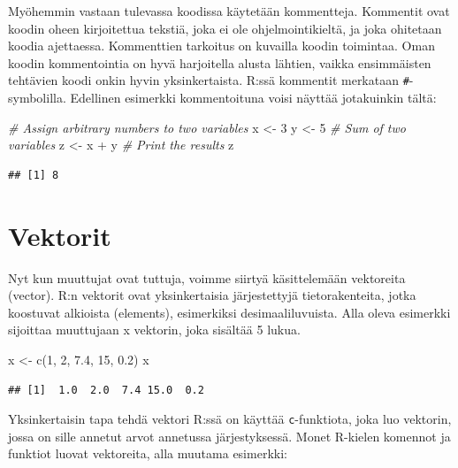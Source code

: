 \documentclass[
]{book}
\newenvironment{Shaded}{\begin{snugshade}}{\end{snugshade}}
\newcommand{\CommentTok}[1]{\textcolor[rgb]{0.56,0.35,0.01}{\textit{#1}}}
\newcommand{\DecValTok}[1]{\textcolor[rgb]{0.00,0.00,0.81}{#1}}
\newcommand{\FloatTok}[1]{\textcolor[rgb]{0.00,0.00,0.81}{#1}}
\newcommand{\FunctionTok}[1]{\textcolor[rgb]{0.00,0.00,0.00}{#1}}
\newcommand{\NormalTok}[1]{#1}
\newcommand{\OtherTok}[1]{\textcolor[rgb]{0.56,0.35,0.01}{#1}}
\newcommand{\SpecialCharTok}[1]{\textcolor[rgb]{0.00,0.00,0.00}{#1}}
\begin{document}
Myöhemmin vastaan tulevassa koodissa käytetään kommentteja. Kommentit ovat koodin oheen kirjoitettua tekstiä, joka ei ole ohjelmointikieltä, ja joka ohitetaan koodia ajettaessa. Kommenttien tarkoitus on kuvailla koodin toimintaa. Oman koodin kommentointia on hyvä harjoitella alusta lähtien, vaikka ensimmäisten tehtävien koodi onkin hyvin yksinkertaista. R:ssä kommentit merkataan \texttt{\#}-symbolilla. Edellinen esimerkki kommentoituna voisi näyttää jotakuinkin tältä:

\begin{Shaded}
\begin{Highlighting}[]
\CommentTok{\# Assign arbitrary numbers to two variables}
\NormalTok{x }\OtherTok{\textless{}{-}} \DecValTok{3}
\NormalTok{y }\OtherTok{\textless{}{-}} \DecValTok{5}
\CommentTok{\# Sum of two variables}
\NormalTok{z }\OtherTok{\textless{}{-}}\NormalTok{ x }\SpecialCharTok{+}\NormalTok{ y}
\CommentTok{\# Print the results}
\NormalTok{z}
\end{Highlighting}
\end{Shaded}

\begin{verbatim}
## [1] 8
\end{verbatim}

\hypertarget{vectors}{%
\section{Vektorit}\label{vectors}}

Nyt kun muuttujat ovat tuttuja, voimme siirtyä käsittelemään vektoreita (vector). R:n vektorit ovat yksinkertaisia järjestettyjä tietorakenteita, jotka koostuvat alkioista (elements), esimerkiksi desimaaliluvuista. Alla oleva esimerkki sijoittaa muuttujaan x vektorin, joka sisältää 5 lukua.

\begin{Shaded}
\begin{Highlighting}[]
\NormalTok{x }\OtherTok{\textless{}{-}} \FunctionTok{c}\NormalTok{(}\DecValTok{1}\NormalTok{, }\DecValTok{2}\NormalTok{, }\FloatTok{7.4}\NormalTok{, }\DecValTok{15}\NormalTok{, }\FloatTok{0.2}\NormalTok{)}
\NormalTok{x}
\end{Highlighting}
\end{Shaded}

\begin{verbatim}
## [1]  1.0  2.0  7.4 15.0  0.2
\end{verbatim}

Yksinkertaisin tapa tehdä vektori R:ssä on käyttää \texttt{c}-funktiota, joka luo vektorin, jossa on sille annetut arvot annetussa järjestyksessä. Monet R-kielen komennot ja funktiot luovat vektoreita, alla muutama esimerkki:
\end{document}
